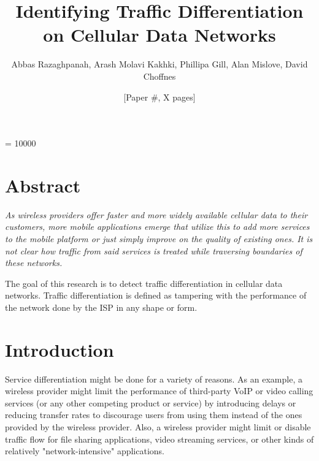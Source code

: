 \documentclass[letterpaper]{sig-alternate-10pt}
\title{Identifying Traffic Differentiation on Cellular Data Networks}
\author{Abbas Razaghpanah, Arash Molavi Kakhki, Phillipa Gill, Alan Mislove, David Choffnes}
\author{[Paper \#, X pages]}
\begin{document}

\widowpenalty = 10000

\maketitle

\section*{Abstract}
{\it
As wireless providers offer faster and more widely available cellular data to their customers, more mobile applications emerge that utilize this to add more services to the mobile platform or just simply improve on the quality of existing ones. It is not clear how traffic from said services is treated while traversing boundaries of these networks.

The goal of this research is to detect traffic differentiation in cellular data networks. Traffic differentiation is defined as tampering with the performance of the network done by the ISP in any shape or form.
}

\section{Introduction}

Service differentiation might be done for a variety of reasons. As an example, a wireless provider might limit the performance of third-party VoIP or video calling services (or any other competing product or service) by introducing delays or reducing transfer rates to discourage users from using them instead of the ones provided by the wireless provider. Also, a wireless provider might limit or disable traffic flow for file sharing applications, video streaming services, or other kinds of relatively "network-intensive" applications.
\end{document}

